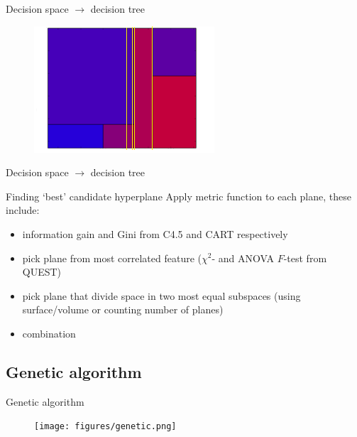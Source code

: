 \documentclass[english]{beamer}
\begin{document}
\begin{frame}{Decision space $\rightarrow$ decision tree}
	\begin{figure}
		\centering
		\includegraphics[scale=1]{figures/space_to_dt.png}
	\end{figure}	
\end{frame}

\begin{frame}{Decision space $\rightarrow$ decision tree}
	\begin{block}{Finding `best' candidate hyperplane}
		Apply metric function to each plane, these include:
		\begin{itemize}
			\item information gain and Gini from C4.5 and CART respectively
			\item pick plane from most correlated feature ($\chi^2$- and ANOVA $F$-test from QUEST)
			\item pick plane that divide space in two most equal subspaces (using surface/volume or counting number of planes)
			\item combination
		\end{itemize}
	\end{block}
	
\end{frame}


\subsection*{Genetic algorithm}
\begin{frame}{Genetic algorithm}
	\begin{figure}
		\centering
		\texttt{[image: figures/genetic.png]}
	\end{figure}	
\end{frame}
\end{document}
